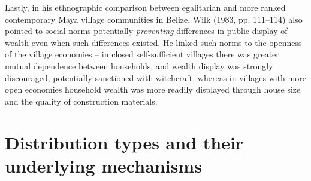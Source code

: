 \documentclass[
  12pt,
]{book}
\begin{document}
Lastly, in his ethnographic comparison between egalitarian and more ranked contemporary Maya village communities in Belize, Wilk (1983, pp. 111--114) also pointed to social norms potentially \emph{preventing} differences in public display of wealth even when such differences existed. He linked such norms to the openness of the village economies -- in closed self-sufficient villages there was greater mutual dependence between households, and wealth display was strongly discouraged, potentially sanctioned with witchcraft, whereas in villages with more open economies household wealth was more readily displayed through house size and the quality of construction materials.

\hypertarget{distributions}{%
\section{Distribution types and their underlying mechanisms}\label{distributions}}
\end{document}
